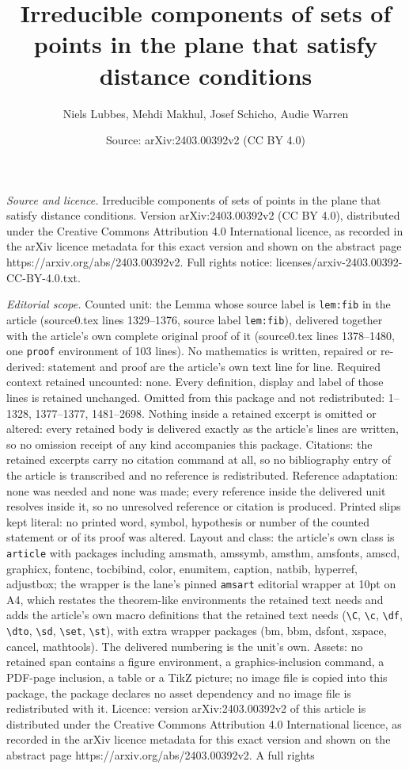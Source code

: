 \documentclass[10pt,a4paper]{amsart}
\title[Irreducible components of sets of points in the plane that s]{Irreducible components of sets of points in the plane that satisfy distance conditions}
\author{Niels Lubbes, Mehdi Makhul, Josef Schicho, Audie Warren}
\date{Source: arXiv:2403.00392v2 (CC BY 4.0)}
\begin{document}
\maketitle

\noindent\emph{Source and licence.} Irreducible components of sets of points in the plane that satisfy distance conditions. Version arXiv:2403.00392v2 (CC BY 4.0), distributed under the Creative Commons Attribution 4.0 International licence, as recorded in the arXiv licence metadata for this exact version and shown on the abstract page https://arxiv.org/abs/2403.00392v2. Full rights notice: licenses/arxiv-2403.00392-CC-BY-4.0.txt.\par\smallskip

\noindent\textit{Editorial scope.} Counted unit: the Lemma whose source label is \texttt{lem:fib} in the article (source0.tex lines 1329--1376, source label \texttt{lem:fib}), delivered together with the article's own complete original proof of it (source0.tex lines 1378--1480, one \texttt{proof} environment of 103 lines). No mathematics is written, repaired or re-derived: statement and proof are the article's own text line for line. Required context retained uncounted: none. Every definition, display and label of those lines is retained unchanged. Omitted from this package and not redistributed: 1--1328, 1377--1377, 1481--2698. Nothing inside a retained excerpt is omitted or altered: every retained body is delivered exactly as the article's lines are written, so no omission receipt of any kind accompanies this package. Citations: the retained excerpts carry no citation command at all, so no bibliography entry of the article is transcribed and no reference is redistributed. Reference adaptation: none was needed and none was made; every reference inside the delivered unit resolves inside it, so no unresolved reference or citation is produced. Printed slips kept literal: no printed word, symbol, hypothesis or number of the counted statement or of its proof was altered. Layout and class: the article's own class is \texttt{article} with packages including amsmath, amssymb, amsthm, amsfonts, amscd, graphicx, fontenc, tocbibind, color, enumitem, caption, natbib, hyperref, adjustbox; the wrapper is the lane's pinned \texttt{amsart} editorial wrapper at 10pt on A4, which restates the theorem-like environments the retained text needs and adds the article's own macro definitions that the retained text needs (\texttt{\textbackslash C}, \texttt{\textbackslash c}, \texttt{\textbackslash df}, \texttt{\textbackslash dto}, \texttt{\textbackslash sd}, \texttt{\textbackslash set}, \texttt{\textbackslash st}), with extra wrapper packages (bm, bbm, dsfont, xspace, cancel, mathtools). The delivered numbering is the unit's own. Assets: no retained span contains a figure environment, a graphics-inclusion command, a PDF-page inclusion, a table or a TikZ picture; no image file is copied into this package, the package declares no asset dependency and no image file is redistributed with it. Licence: version arXiv:2403.00392v2 of this article is distributed under the Creative Commons Attribution 4.0 International licence, as recorded in the arXiv licence metadata for this exact version and shown on the abstract page https://arxiv.org/abs/2403.00392v2. A full rights 
\end{document}
